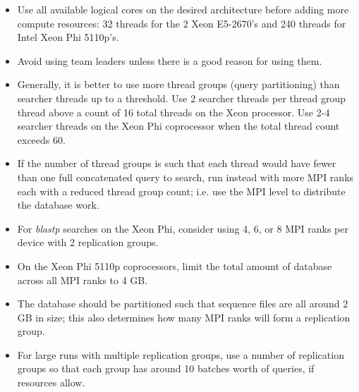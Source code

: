 \documentclass[10pt]{article}
\begin{document}
\begin{itemize}
\item Use all available logical cores on the desired architecture before adding more compute resources: 32 threads for the 2 Xeon E5-2670's and 240 threads for Intel Xeon Phi 5110p's.
\item Avoid using team leaders unless there is a good reason for using them.
\item Generally, it is better to use more thread groups (query partitioning) than searcher threads up to a threshold.  Use 2 searcher threads per thread group thread above a count of 16 total threads
on the Xeon processor.  Use 2-4 searcher threads on the Xeon Phi coprocessor when the total thread count exceeds 60.
\item If the number of thread groups is such that each thread would have fewer than one full concatenated query to search, run instead with more MPI ranks each with a reduced thread group count; i.e.
use the MPI level to distribute the database work.
\item For \emph{blastp} searches on the Xeon Phi, consider using 4, 6, or 8 MPI ranks per device with 2 replication groups.
\item On the Xeon Phi 5110p coprocessors, limit the total amount of database across all MPI ranks to 4 GB.
\item The database should be partitioned such that sequence files are all around 2 GB in size; this also determines how many MPI ranks will form a replication group.
\item For large runs with multiple replication groups, use a number of replication groups so that each group has around 10 batches worth of queries, if resources allow.
\end{itemize}
\end{document}
